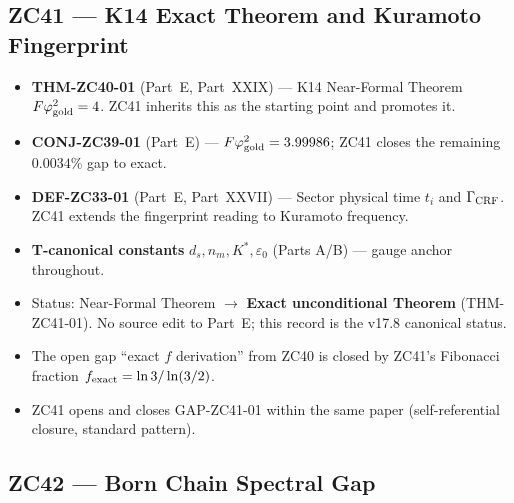 \documentclass[12pt, a4paper]{article}
\begin{document}
\subsection{ZC41 --- K14 Exact Theorem and Kuramoto Fingerprint}

\begin{inheritbox}
\begin{itemize}[leftmargin=*, noitemsep]
\item \textbf{THM-ZC40-01} (Part~E, Part~XXIX) ---
  K14 Near-Formal Theorem $F\varphi_{\rm gold}^2 = 4$.
  ZC41 inherits this as the starting point and promotes it.
\item \textbf{CONJ-ZC39-01} (Part~E) ---
  $F\varphi_{\rm gold}^2 = 3.99986$; ZC41 closes the
  remaining $0.0034\%$ gap to exact.
\item \textbf{DEF-ZC33-01} (Part~E, Part~XXVII) ---
  Sector physical time $t_i$ and $\Gamma_{\rm CRF}$.
  ZC41 extends the fingerprint reading to Kuramoto frequency.
\item \textbf{T-canonical constants} $d_s, n_m, K^*, \varepsilon_0$
  (Parts A/B) --- gauge anchor throughout.
\end{itemize}
\end{inheritbox}

\begin{correctionbox}
\begin{itemize}[leftmargin=*, noitemsep]
\item {}
  Status: Near-Formal Theorem $\to$
  \textbf{Exact unconditional Theorem} (THM-ZC41-01).
  No source edit to Part~E; this record is the v17.8
  canonical status.
\item {}
  The open gap ``exact $f$ derivation'' from ZC40 is
  closed by ZC41's Fibonacci fraction
  $f_{\rm exact} = \ln 3/\ln(3/2)$.
\item {} ZC41 opens and closes
  GAP-ZC41-01 within the same paper
  (self-referential closure, standard pattern).
\end{itemize}
\end{correctionbox}

\subsection{ZC42 --- Born Chain Spectral Gap}
\end{document}
